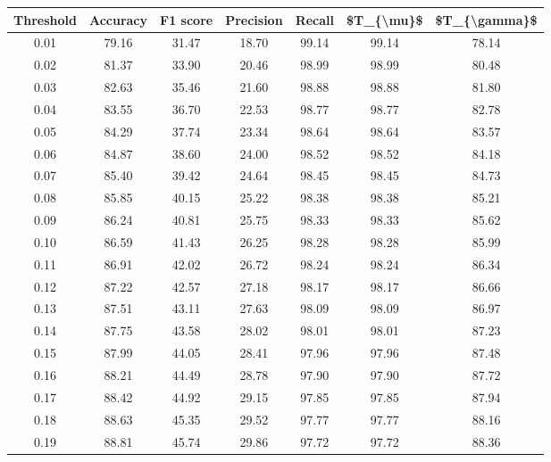 \begin{tabular}{|c|c|c|c|c|c|c|}
\hline
 Threshold &  Accuracy &  F1 score &  Precision &  Recall &  \$T\_\{\textbackslash mu\}\$ &  \$T\_\{\textbackslash gamma\}\$ \\
\hline
      0.01 &     79.16 &     31.47 &      18.70 &   99.14 &      99.14 &         78.14 \\
      0.02 &     81.37 &     33.90 &      20.46 &   98.99 &      98.99 &         80.48 \\
      0.03 &     82.63 &     35.46 &      21.60 &   98.88 &      98.88 &         81.80 \\
      0.04 &     83.55 &     36.70 &      22.53 &   98.77 &      98.77 &         82.78 \\
      0.05 &     84.29 &     37.74 &      23.34 &   98.64 &      98.64 &         83.57 \\
      0.06 &     84.87 &     38.60 &      24.00 &   98.52 &      98.52 &         84.18 \\
      0.07 &     85.40 &     39.42 &      24.64 &   98.45 &      98.45 &         84.73 \\
      0.08 &     85.85 &     40.15 &      25.22 &   98.38 &      98.38 &         85.21 \\
      0.09 &     86.24 &     40.81 &      25.75 &   98.33 &      98.33 &         85.62 \\
      0.10 &     86.59 &     41.43 &      26.25 &   98.28 &      98.28 &         85.99 \\
      0.11 &     86.91 &     42.02 &      26.72 &   98.24 &      98.24 &         86.34 \\
      0.12 &     87.22 &     42.57 &      27.18 &   98.17 &      98.17 &         86.66 \\
      0.13 &     87.51 &     43.11 &      27.63 &   98.09 &      98.09 &         86.97 \\
      0.14 &     87.75 &     43.58 &      28.02 &   98.01 &      98.01 &         87.23 \\
      0.15 &     87.99 &     44.05 &      28.41 &   97.96 &      97.96 &         87.48 \\
      0.16 &     88.21 &     44.49 &      28.78 &   97.90 &      97.90 &         87.72 \\
      0.17 &     88.42 &     44.92 &      29.15 &   97.85 &      97.85 &         87.94 \\
      0.18 &     88.63 &     45.35 &      29.52 &   97.77 &      97.77 &         88.16 \\
      0.19 &     88.81 &     45.74 &      29.86 &   97.72 &      97.72 &         88.36 \\

\end{tabular}
